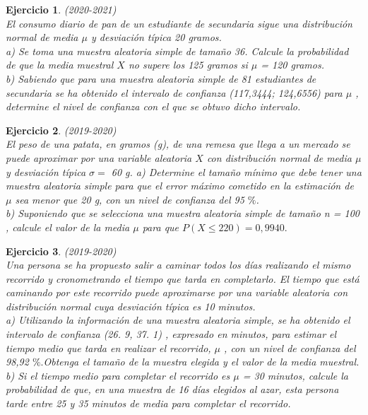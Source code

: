 \documentclass[12pt, a4paper]{amsart}
\newtheorem{ejer}{Ejercicio}
\begin{document}
\begin{ejer}\em (2020-2021)\\
El consumo diario de pan de un estudiante de secundaria sigue una distribución normal de media $\mu$ y desviación
típica 20 gramos.\\
a) Se toma una muestra aleatoria simple de tamaño 36. Calcule la probabilidad de que la media muestral $X$ no
supere los 125 gramos si $\mu$ = 120 gramos.\\
b) Sabiendo que para una muestra aleatoria simple de 81 estudiantes de secundaria se ha obtenido el intervalo
de confianza (117,3444; 124,6556) para $\mu$ , determine el nivel de confianza con el que se obtuvo dicho intervalo.
\end{ejer}

\begin{ejer}\em (2019-2020)\\
El peso de una patata, en gramos (g), de una remesa que llega a un mercado se puede aproximar por una
variable aleatoria $X$ con distribución normal de media $\mu$ y desviación típica  $\sigma =$ 60 g.
a) Determine el tamaño mínimo que debe tener una muestra aleatoria simple para que el error máximo cometido
en la estimación de $\mu$ sea menor que 20 g, con un nivel de confianza del 95 $\%$.\\
b) Suponiendo que se selecciona una muestra aleatoria simple de tamaño n = 100 , calcule el valor de la media
$\mu$ para que $P (X \leqslant 220) = 0,9940.$
\end{ejer}

\begin{ejer}\em (2019-2020)\\
Una persona se ha propuesto salir a caminar todos los días realizando el mismo recorrido y cronometrando el
tiempo que tarda en completarlo. El tiempo que está caminando por este recorrido puede aproximarse por una
variable aleatoria con distribución normal cuya desviación típica es 10 minutos.\\
a) Utilizando la información de una muestra aleatoria simple, se ha obtenido el intervalo de confianza
(26. 9, 37. 1) , expresado en minutos, para estimar el tiempo medio que tarda en realizar el recorrido, $\mu$ , con
un nivel de confianza del 98,92 $\%.$Obtenga el tamaño de la muestra elegida y el valor de la media muestral.\\
b) Si el tiempo medio para completar el recorrido es $\mu$ = 30 minutos, calcule la probabilidad de que, en una
muestra de 16 días elegidos al azar, esta persona tarde entre 25 y 35 minutos de media para completar el
recorrido.
\end{ejer}
\end{document}
